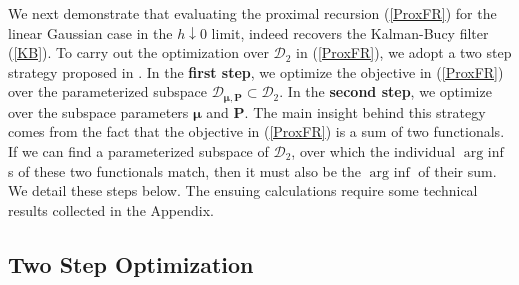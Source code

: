 \documentclass[letterpaper,10pt,twocolumn,conference]{ieeeconf}
\newcommand{\cD}{{\mathscr{D}}}
\newcommand{\bmu}{\bm{\mu}}
\newcommand{\bbP}{{\bm{P}}}
\newcommand{\arginf}{\operatorname{arg\:inf}}
\begin{document}
We next demonstrate that evaluating the proximal recursion (\ref{ProxFR}) for the linear Gaussian case in the $h\downarrow 0$ limit, indeed recovers the Kalman-Bucy filter (\ref{KB}). To carry out the optimization over $\cD_{2}$ in (\ref{ProxFR}), we adopt a two step strategy proposed in \cite{HalderGeorgiouCDC2017}. In the \textbf{first step}, we optimize the objective in (\ref{ProxFR}) over the parameterized subspace $\cD_{\bmu,\bbP} \subset \cD_{2}$. In the \textbf{second step}, we optimize over the subspace parameters $\bmu$ and $\bbP$. The main insight behind this strategy comes from the fact that the objective in (\ref{ProxFR}) is a sum of two functionals. If we can find a parameterized subspace of $\cD_{2}$, over which the individual $\arginf$s of these two functionals match, then it must also be the $\arginf$ of their sum. We detail these steps below. The ensuing calculations require some technical results collected in the Appendix.

\subsection{Two Step Optimization}
\end{document}
